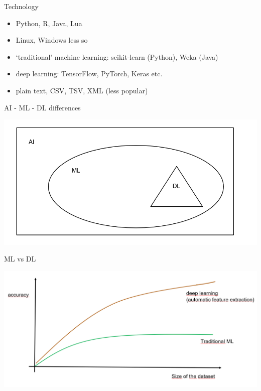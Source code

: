 \documentclass[bigger]{beamer}
\begin{document}
\begin{frame}{Technology}
    \begin{itemize}
        \item Python, R, Java, Lua
        \item Linux, Windows less so
        \item `traditional' machine learning: scikit-learn (Python), Weka (Java)
        \item deep learning: TensorFlow, PyTorch, Keras etc.
        \item plain text, CSV, TSV, XML (less popular)
    \end{itemize}
\end{frame}

\begin{frame}{AI - ML - DL differences}
    \begin{center}
        \includegraphics[width=.8\textwidth]{fig/ai_ml_dl.png}
    \end{center}
\end{frame}

\begin{frame}{ML vs DL}
    \begin{center}
        \includegraphics[width=.8\textwidth]{fig/ml_dl_scale.png}
    \end{center}
\end{frame}
\end{document}

